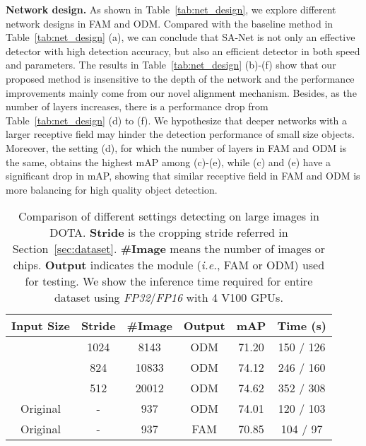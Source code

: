 \documentclass[10pt,journal,final]{IEEEtran}
\def\ie{{\em i.e.}}
\begin{document}
{\bf Network design.} As shown in Table~\ref{tab:net_design}, we explore different network designs in FAM and ODM. Compared with the baseline method in Table~\ref{tab:net_design} (a), we can conclude that SA-Net is not only an effective detector with high detection accuracy, but also an efficient detector in both speed and parameters. 
The results in Table~\ref{tab:net_design} (b)-(f) show that our proposed method is insensitive to the depth of the network and the performance improvements mainly come from our novel alignment mechanism. Besides, as the number of layers increases, there is a performance drop from Table~\ref{tab:net_design} (d) to (f). We hypothesize that deeper networks with a larger receptive field may hinder the detection performance of small size objects. Moreover, the setting (d), for which the number of layers in FAM and ODM is the same, obtains the highest mAP among (c)-(e), while (c) and (e) have a significant drop in mAP, showing that similar receptive field in FAM and ODM is more balancing for high quality object detection.


\begin{table}[!t]
  \caption{Comparison of different settings detecting on large images in DOTA. {\bf Stride} is the cropping stride referred in Section~\ref{sec:dataset}. {\bf \#Image} means the number of images or chips. {\bf Output} indicates the module (\ie, FAM or ODM) used for testing. We show the inference time required for entire dataset using \emph{FP32}/\emph{FP16} with 4 V100 GPUs.}
    \vspace{-4mm}
    \begin{center}
    \begin{tabular}{c|c|c|c|c|c} \hline
    Input Size         & Stride &\#Image& Output & mAP & Time (s)   \\ \hline
     & 1024   & 8143  & ODM    &71.20& 150 / 126  \\
     & 824    & 10833 & ODM    &74.12& 246 / 160  \\
     & 512    & 20012 & ODM    &74.62& 352 / 308  \\
    Original           & -      & 937   & ODM    &74.01& 120 / 103  \\
    Original           & -      & 937   & FAM    &70.85& 104 / 97   \\ \hline
    \end{tabular}
    \end{center}     \label{tab:det_large}
    \vspace{-3mm}
\end{table}
\end{document}
